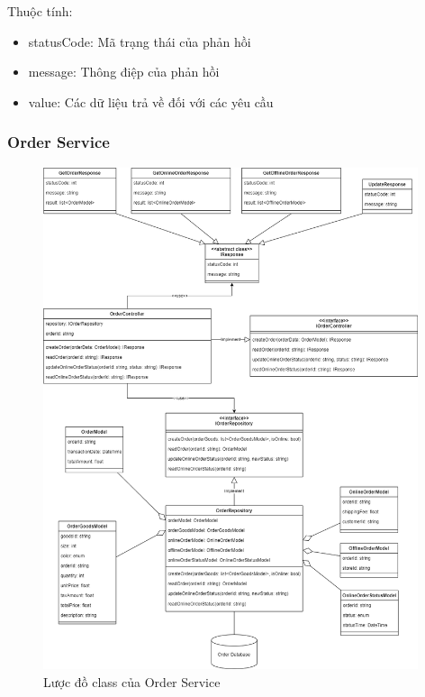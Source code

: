 	Thuộc tính:
	\begin{itemize}
		\item statusCode: Mã trạng thái của phản hồi
		\item message: Thông điệp của phản hồi
		\item value: Các dữ liệu trả về đối với các yêu cầu
	\end{itemize}

\subsubsection{Order Service}
\begin{figure}[!htp]
	\centering
	\includegraphics[width=11cm]{img/Architecture/service/OrderService.png}
	\newline
	\caption{Lược đồ class của Order Service}
\end{figure}



